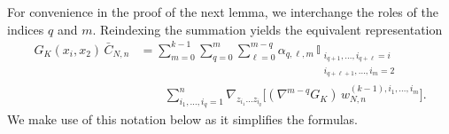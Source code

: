 \documentclass[pdflatex,sn-mathphys-num]{sn-jnl}
\theoremstyle{thmstyleone}%
\theoremstyle{thmstyletwo}%
\theoremstyle{thmstylethree}%
\begin{document}
For convenience in the proof of the next lemma, we interchange the roles of the indices $q$ and $m$. Reindexing the summation yields the equivalent representation
\begin{equation}\label{eq:G_k_on_cumulants}
\begin{aligned}
G_K(x_i,x_2)\,\bar{C}_{N,n}
&=
\sum_{m=0}^{k-1}\sum_{q=0}^{m}\sum_{\ell=0}^{m-q}
\alpha_{q,\ell,m}\,
\mathbb{I}_{\substack{
i_{q+1},\ldots,i_{q+\ell}=i \\
i_{q+\ell+1},\ldots,i_m=2
}} \\
&\qquad 
\sum_{i_1,\ldots,i_q=1}^{n}
\nabla_{z_{i_1}\dots z_{i_q}}
\Big[
(\nabla^{m-q}G_K)\,
w_{N,n}^{(k-1),i_1,\ldots,i_m}
\Big].
\end{aligned}
\end{equation}
We make use of this notation below as it simplifies the formulas.\\ 
\end{document}

